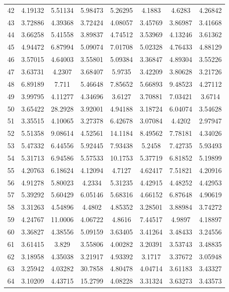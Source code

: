 \begin{center}
\begin{longtable}{cccccccc}
42 & 4.19132 & 5.51134 & 5.98473 & 5.26295 & 4.1883 & 4.6283 & 4.26842\\
43 & 3.72886 & 4.39368 & 3.72424 & 4.08057 & 3.45769 & 3.86987 & 3.41668\\
44 & 3.66258 & 5.41558 & 3.89837 & 4.74512 & 3.53969 & 4.13246 & 3.61362\\
45 & 4.94472 & 6.87994 & 5.09074 & 7.01708 & 5.02328 & 4.76433 & 4.88129\\
46 & 3.57015 & 4.64003 & 3.55801 & 5.09384 & 3.36847 & 4.89304 & 3.55226\\
47 & 3.63731 & 4.2307 & 3.68407 & 5.9735 & 3.42209 & 3.80628 & 3.21726\\
48 & 6.89189 & 7.711 & 5.46648 & 7.85652 & 5.66893 & 9.48523 & 4.27112\\
49 & 3.99795 & 4.11277 & 4.34696 & 3.6127 & 3.70881 & 7.03421 & 3.6714\\
50 & 3.65422 & 28.2928 & 3.92001 & 4.94188 & 3.18724 & 6.04074 & 3.54628\\
51 & 3.35515 & 4.10065 & 3.27378 & 6.42678 & 3.07084 & 4.4202 & 2.97947\\
52 & 5.51358 & 9.08614 & 4.52561 & 14.1184 & 8.49562 & 7.78181 & 4.34026\\
53 & 5.47332 & 6.44556 & 5.92445 & 7.93438 & 5.2458 & 7.42735 & 5.93493\\
54 & 5.31713 & 6.94586 & 5.57533 & 10.1753 & 5.37719 & 6.81852 & 5.19899\\
55 & 4.20763 & 6.18624 & 4.12094 & 4.7127 & 4.62417 & 7.51821 & 4.20916\\
56 & 4.91278 & 5.80023 & 4.2334 & 5.31235 & 4.42915 & 4.48252 & 4.42953\\
57 & 5.39292 & 5.60429 & 6.05146 & 5.68316 & 4.66152 & 6.87648 & 4.90619\\
58 & 3.31263 & 4.54896 & 4.4802 & 4.85352 & 3.28501 & 3.88984 & 3.74272\\
59 & 4.24767 & 11.0006 & 4.06722 & 4.8616 & 7.44517 & 4.9897 & 4.18897\\
60 & 3.36827 & 4.38556 & 5.09159 & 3.63405 & 3.41264 & 3.48433 & 3.24556\\
61 & 3.61415 & 3.829 & 3.55806 & 4.00282 & 3.20391 & 3.53743 & 3.48835\\
62 & 3.18958 & 4.35038 & 3.21917 & 4.93392 & 3.1717 & 3.37672 & 3.05948\\
63 & 3.25942 & 4.03282 & 30.7858 & 4.80478 & 4.04714 & 3.61183 & 3.43327\\
64 & 3.10209 & 4.43715 & 15.2799 & 4.08228 & 3.31324 & 3.63273 & 3.43573\\

\end{longtable}
\end{center}
